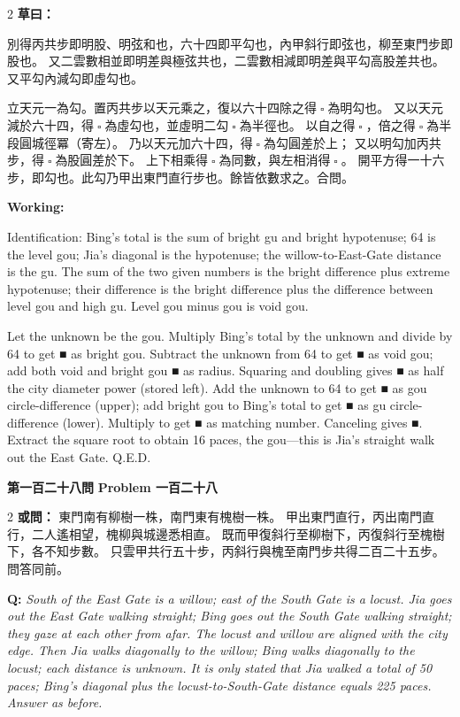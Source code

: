\documentclass[11pt,a4paper]{article}
\let\origsquare\square
\renewcommand{\square}{\ensuremath{\origsquare}}%
\newcommand{\wen}[1]{%
  \par\vspace{0.5em}%
  \noindent\textcolor{problemcolor}{\textbf{第#1問}}%
  \hfill\textcolor{problemcolor}{\textbf{Problem #1}}\par\nopagebreak%
  \vspace{0.3em}%
}
\newcommand{\owen}[1]{%
  \noindent\textcolor{problemcolor}{\textbf{或問：}}{\tradfont #1}\par\nopagebreak%
}
\newcommand{\oweneng}[1]{%
  \noindent\textcolor{engcolor}{\textbf{Q: }}{\itshape #1}\par\nopagebreak%
}
\newcommand{\tsaoyue}[1]{%
  \noindent\textcolor{workcolor}{\textbf{草曰：}}{\tradfont #1}\par%
}
\newcommand{\tsaoyueeng}[1]{%
  \noindent\textcolor{engcolor}{\textbf{Working: }}{\small #1}\par%
}
\begin{document}
\begin{paracol}{2}
\tsaoyue{%
別得丙共步即明股、明弦和也，六十四即平勾也，內甲斜行即弦也，柳至東門步即股也。
又二雲數相並即明差與極弦共也，二雲數相減即明差與平勾高股差共也。
又平勾內減勾即虛勾也。

立天元一為勾。置丙共步以天元乘之，復以六十四除之得$ \; \square \; $為明勾也。
又以天元減於六十四，得$ \; \square \; $為虛勾也，並虛明二勾$ \; \square \; $為半徑也。
以自之得$ \; \square \; $，倍之得$ \; \square \; $為半段圓城徑冪（寄左）。
乃以天元加六十四，得$ \; \square \; $為勾圓差於上；
又以明勾加丙共步，得$ \; \square \; $為股圓差於下。
上下相乘得$ \; \square \; $為同數，與左相消得$ \; \square \; $。
開平方得一十六步，即勾也。此勾乃甲出東門直行步也。餘皆依數求之。合問。}
\switchcolumn
\tsaoyueeng{%
Identification: Bing's total is the sum of bright gu and bright hypotenuse; 64 is the level gou; Jia's diagonal is the hypotenuse; the willow-to-East-Gate distance is the gu. The sum of the two given numbers is the bright difference plus extreme hypotenuse; their difference is the bright difference plus the difference between level gou and high gu. Level gou minus gou is void gou.

Let the unknown be the gou. Multiply Bing's total by the unknown and divide by 64 to get ■ as bright gou. Subtract the unknown from 64 to get ■ as void gou; add both void and bright gou ■ as radius. Squaring and doubling gives ■ as half the city diameter power (stored left). Add the unknown to 64 to get ■ as gou circle-difference (upper); add bright gou to Bing's total to get ■ as gu circle-difference (lower). Multiply to get ■ as matching number. Canceling gives ■. Extract the square root to obtain 16 paces, the gou---this is Jia's straight walk out the East Gate. Q.E.D.}
\end{paracol}

\vspace{0.5cm}

\wen{一百二十八}

\begin{paracol}{2}
\owen{%
東門南有柳樹一株，南門東有槐樹一株。
甲出東門直行，丙出南門直行，二人遙相望，槐柳與城邊悉相直。
既而甲復斜行至柳樹下，丙復斜行至槐樹下，各不知步數。
只雲甲共行五十步，丙斜行與槐至南門步共得二百二十五步。問答同前。}
\switchcolumn
\oweneng{%
South of the East Gate is a willow; east of the South Gate is a locust. Jia goes out the East Gate walking straight; Bing goes out the South Gate walking straight; they gaze at each other from afar. The locust and willow are aligned with the city edge. Then Jia walks diagonally to the willow; Bing walks diagonally to the locust; each distance is unknown. It is only stated that Jia walked a total of 50 paces; Bing's diagonal plus the locust-to-South-Gate distance equals 225 paces. Answer as before.}
\end{paracol}
\end{document}
